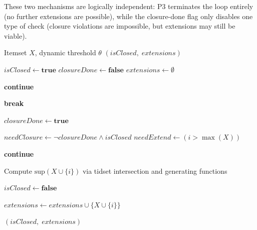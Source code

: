 \documentclass[10pt,letterpaper]{article}
\begin{document}
These two mechanisms are logically independent: P3 terminates the loop entirely (no further extensions are possible), while the closure-done flag only disables one type of check (closure violations are impossible, but extensions may still be viable).

\begin{algorithm}[!h]
\caption{CheckClosureAndExtend}
\label{alg:closure-check}
\begin{algorithmic}[1]
\REQUIRE Itemset $X$, dynamic threshold $\theta$
\ENSURE $(\mathit{isClosed},\; \mathit{extensions})$

\STATE $\mathit{isClosed} \gets \textbf{true}$
\STATE $\mathit{closureDone} \gets \textbf{false}$
\STATE $\mathit{extensions} \gets \emptyset$

     \textbf{continue} \ENDIF
    
        \STATE \textbf{break}
    \ENDIF
    
        \STATE $\mathit{closureDone} \gets \textbf{true}$
    \ENDIF
    
    \STATE $\mathit{needClosure} \gets \neg\mathit{closureDone} \wedge \mathit{isClosed}$
    \STATE $\mathit{needExtend} \gets (i > \max(X))$
    
        \STATE \textbf{continue}
    \ENDIF
    
    \STATE Compute $\mathrm{sup}(X \cup \{i\})$ via tidset intersection and generating functions
    
        \STATE $\mathit{isClosed} \gets \textbf{false}$
    \ENDIF
    
        \STATE $\mathit{extensions} \gets \mathit{extensions} \cup \{X \cup \{i\}\}$
    \ENDIF
\ENDFOR

\RETURN $(\mathit{isClosed},\; \mathit{extensions})$
\end{algorithmic}
\end{algorithm}
\end{document}
